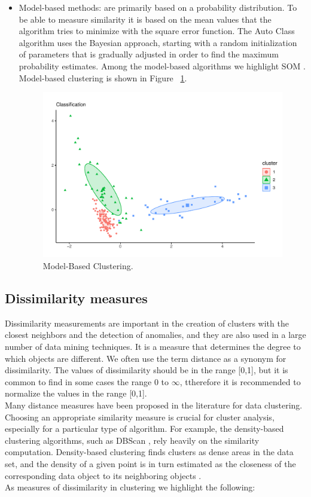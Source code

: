 \begin{itemize}
  \item Model-based methods: are primarily based on a probability distribution. To be able to measure similarity it is based on the mean values that the algorithm tries to minimize with the square error function. The Auto Class algorithm uses the Bayesian approach, starting with a random initialization of parameters that is gradually adjusted in order to find the maximum probability estimates. Among the model-based algorithms we highlight SOM \citep{b34}. Model-based clustering is shown in Figure ~\ref{fig:model}.
    \begin{figure}[htbp]
  \centering
   \includegraphics[width=0.9\linewidth, height=0.16\textheight]{img/model.pdf}
    \caption{Model-Based Clustering.}
    \label{fig:model}%
\end{figure}
\end{itemize}

\subsection {Dissimilarity measures}

Dissimilarity measurements are important in the creation of clusters with the closest neighbors and the detection of anomalies, and they are also used in a large number of data mining techniques. It is a measure that determines the degree to which objects are different. We often use the term distance as a synonym for dissimilarity. The values of dissimilarity should be in the range [0,1], but it is common to find in some cases the range 0 to $\infty$, ttherefore it is recommended to normalize the values in the range [0,1].
\\
Many distance measures have been proposed in the literature for data clustering. Choosing an appropriate similarity measure is crucial for cluster analysis, especially for a particular type of algorithm. For example, the density-based clustering algorithms, such as DBScan \citep{b28}, rely heavily on the similarity computation. Density-based clustering finds clusters as dense areas in the data set, and the density of a given point is in turn estimated as the closeness of the corresponding data object to its neighboring objects \citep{b50} \citep{b51}.
\\
As measures of dissimilarity in clustering we highlight the following:

